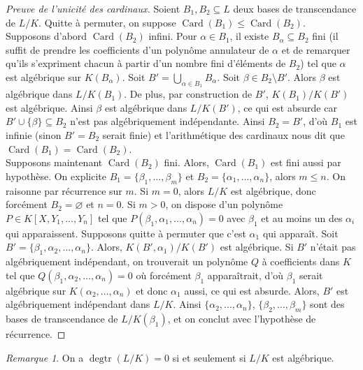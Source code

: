 \documentclass{article}
\DeclareMathOperator{\degtr}{degtr}
\DeclareMathOperator{\Card}{Card}
\theoremstyle{plain}
\theoremstyle{definition}
\theoremstyle{remark}
\newtheorem*{remark}{Remarque}
\begin{document}
\begin{proof}[Preuve de l'unicité des cardinaux]
    Soient $B_1,B_2 \subseteq L$ deux bases de transcendance de $L/K$. Quitte à permuter, on suppose $\Card(B_1) \le \Card(B_2)$. \\
    Supposons d'abord $\Card(B_2)$ infini. Pour $\alpha \in B_1$, il existe $B_\alpha \subseteq B_2$ fini (il suffit de prendre les coefficients d'un polynôme annulateur de $\alpha$ et de remarquer qu'ils s'expriment chacun à partir d'un nombre fini d'éléments de $B_2$) tel que $\alpha$ est algébrique sur $K(B_\alpha)$. Soit $B' = \bigcup\limits_{\alpha \in B_1} B_\alpha$. Soit $\beta \in B_2 \setminus B'$. Alors $\beta$ est algébrique dans $L/K(B_1)$. De plus, par construction de $B'$, $K(B_1)/K(B')$ est algébrique. Ainsi $\beta$ est algébrique dans $L/K(B')$, ce qui est absurde car $B'\cup \{\beta\} \subseteq B_2$ n'est pas algébriquement indépendante. Ainsi $B_2 = B'$, d'où $B_1$ est infinie (sinon $B' = B_2$ serait finie) et l'arithmétique des cardinaux nous dit que $\Card(B_1) = \Card(B_2)$. \\
    Supposons maintenant $\Card(B_2)$ fini. Alors, $\Card(B_1)$ est fini aussi par hypothèse. On explicite $B_1 = \{\beta_1,\dots,\beta_m\}$ et $B_2 = \{\alpha_1,\dots,\alpha_n\}$, alors $m \le n$. On raisonne par récurrence sur $m$. Si $m=0$, alors $L/K$ est algébrique, donc forcément $B_2 = \varnothing$ et $n=0$. Si $m > 0$, on dispose d'un polynôme $P \in K[X,Y_1,\dots,Y_n]$ tel que $P(\beta_1,\alpha_1,\dots,\alpha_n) = 0$ avec $\beta_1$ et au moins un des $\alpha_i$ qui apparaissent. Supposons quitte à permuter que c'est $\alpha_1$ qui apparaît. Soit $B' = \{\beta_1,\alpha_2,\dots,\alpha_n\}$. Alors, $K(B',\alpha_1)/K(B')$ est algébrique. Si $B'$ n'était pas algébriquement indépendant, on trouverait un polynôme $Q$ à coefficients dans $K$ tel que $Q(\beta_1,\alpha_2,\dots,\alpha_n) = 0$ où forcément $\beta_1$ apparaîtrait, d'où $\beta_1$ serait algébrique sur $K(\alpha_2,\dots,\alpha_n)$ et donc $\alpha_1$ aussi, ce qui est absurde. Alors, $B'$ est algébriquement indépendant dans $L/K$. Ainsi $\{\alpha_2,\dots,\alpha_n\}$, $\{\beta_2,\dots,\beta_m\}$ sont des bases de transcendance de $L/K(\beta_1)$, et on conclut avec l'hypothèse de récurrence.
\end{proof}

\begin{remark}
    On a $\degtr(L/K) = 0$ si et seulement si $L/K$ est algébrique.
\end{remark}
\end{document}
